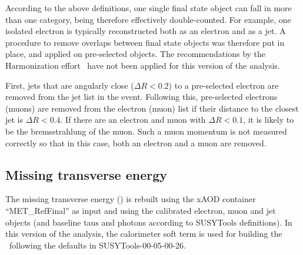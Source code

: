 According to the above definitions, one single final state object can fall in more than one category, being therefore effectively double-counted. For example, one isolated electron is typically reconstructed both as an electron and as a jet. A procedure to remove overlaps between final state objects was therefore put in place, and applied on pre-selected objects. The recommendations by the Harmonization effort~\cite{Harmonization} have not been applied for this version of the analysis.


First, jets that are angularly close ($\Delta R < 0.2$) to a pre-selected electron are removed from the jet list in the event. Following this, pre-selected electrons (muons) are removed from the electron (muon) list if their distance to the closest jet is $\Delta R < 0.4$. 
If there are an electron and muon with $\Delta R<0.1$, it is likely to be the bremsstrahlung
of the muon. Such a muon momentum is not measured correctly so that in this case, both an electron
and a muon are removed.



\subsection{Missing transverse energy}
\label{sec:objects_met}

The missing transverse energy (\met) is rebuilt using the xAOD container ``MET\_RefFinal'' as input and using the calibrated electron, muon and jet objects (and baseline taus and photons according to SUSYTools definitions). In this version of the analysis, the calorimeter soft term is used for building the \met\ following the defaults in SUSYTools-00-05-00-26.


\FloatBarrier

